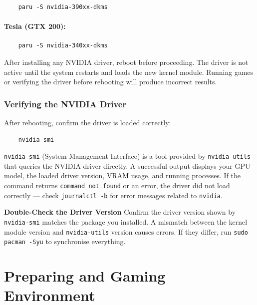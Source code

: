 \documentclass{article}
\newcommand{\code}[1]{\colorbox{codebg}{\texttt{#1}}}
\begin{document}
\begin{verbatim}
	paru -S nvidia-390xx-dkms
\end{verbatim}

\paragraph{Tesla (GTX 200):}

\begin{verbatim}
	paru -S nvidia-340xx-dkms
\end{verbatim}

\begin{tcolorbox}[arc=12pt, outer arc=10pt,
	colback=red!5!white, colframe=red!60!black,
	title=\textbf{Reboot Required}]
	After installing any NVIDIA driver, reboot before proceeding. The driver is not
	active until the system restarts and loads the new kernel module. Running games
	or verifying the driver before rebooting will produce incorrect results.
\end{tcolorbox}

\subsubsection{Verifying the NVIDIA Driver}

After rebooting, confirm the driver is loaded correctly:

\begin{verbatim}
	nvidia-smi
\end{verbatim}

\noindent \code{nvidia-smi} (System Management Interface) is a tool provided by
\code{nvidia-utils} that queries the NVIDIA driver directly. A successful output
displays your GPU model, the loaded driver version, VRAM usage, and running
processes. If the command returns \code{command not found} or an error, the
driver did not load correctly --- check \code{journalctl -b} for error messages
related to \code{nvidia}.

\begin{callout}{\textbf{Double-Check the Driver Version}}
	Confirm the driver version shown by \code{nvidia-smi} matches the package you
	installed. A mismatch between the kernel module version and \code{nvidia-utils}
	version causes errors. If they differ, run \code{sudo pacman -Syu} to
	synchronise everything.
\end{callout}

\newpage
\section{Preparing and Gaming Environment}
\end{document}
